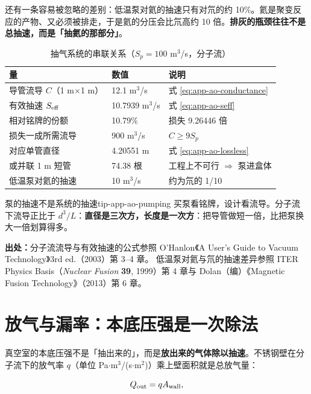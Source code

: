 还有一条容易被忽略的差别：低温泵对氦的抽速只有对氘的约 10\%。氦是聚变反应的产物、又必须被排走，于是氦的分压会比氘高约 10 倍。\textbf{排灰的瓶颈往往不是总抽速，而是「抽氦的那部分」}。

\begin{table}[htbp]
\centering
\caption{抽气系统的串联关系（$S_p=100$ m$^3$/s，分子流）}
\label{tab:app-ao-pumping}
{\small
\begin{tabular}{p{4.8cm}p{3.2cm}p{6.6cm}}
\toprule
量 & 数值 & 说明 \\
\midrule
导管流导 $C$（1 m$\times$1 m） & 12.1 m$^3$/s & 式 \eqref{eq:app-ao-conductance} \\
有效抽速 $S_{\rm eff}$ & 10.7939 m$^3$/s & 式 \eqref{eq:app-ao-seff} \\
相对铭牌的份额 & 10.79\% & 损失 9.26446 倍 \\
损失一成所需流导 & 900 m$^3$/s & $C\ge 9S_p$ \\
对应单管直径 & 4.20551 m & 式 \eqref{eq:app-ao-lossless} \\
或并联 1 m 短管 & 74.38 根 & 工程上不可行 $\Rightarrow$ 泵进盒体 \\
低温泵对氦的抽速 & 10 m$^3$/s & 约为氘的 1/10 \\
\bottomrule
\end{tabular}}
\end{table}

\begin{tip}{泵的抽速不是系统的抽速}{tip-app-ao-pumping}
买泵看铭牌，设计看流导。分子流下流导正比于 $d^3/L$：\textbf{直径是三次方，长度是一次方}：把导管做短一倍，比把泵换大一倍划算得多。
\end{tip}

{\small

\textbf{出处：}分子流流导与有效抽速的公式参照 O'Hanlon《A User's Guide to Vacuum Technology》3rd ed.（2003）第 3--4 章。
低温泵对氦与氘的抽速差异参照 ITER Physics Basis（\textit{Nuclear Fusion} \textbf{39}, 1999）第 4 章与 Dolan（编）《Magnetic Fusion Technology》（2013）第 6 章。
}

\section{放气与漏率：本底压强是一次除法}
\label{sec:app-ao-outgassing}

真空室的本底压强不是「抽出来的」，而是\textbf{放出来的气体除以抽速}。不锈钢壁在分子流下的放气率 $q$（单位 Pa$\cdot$m$^3$/(s$\cdot$m$^2$)）乘上壁面积就是总放气量：

\begin{equation}
Q_{\rm out}=qA_{\rm wall},
\label{eq:app-ao-outgas}
\end{equation}

